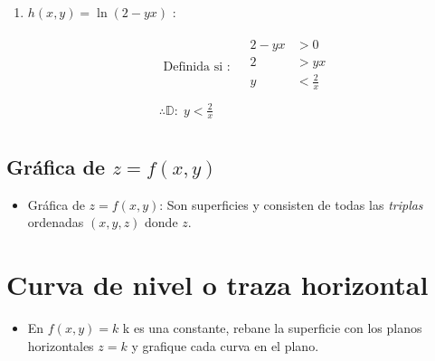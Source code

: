 \begin{enumerate}
    \item $h(x,y)=\ln(2-yx)$ : 
        \begin{center}
           \begin{align*}
               \text{  Definida si  }: \quad \begin{matrix}
                   2-yx &> 0 \\ 
                   2 &> yx \\ 
                   y &< \frac{2}{x} \\ 
               \end{matrix} \\ 
               \therefore \mathbb{D}: \; y < \frac{2}{x} \\ 
           \end{align*}
        \end{center}
\end{enumerate}


\subsection{Gráfica de $z=f(x,y)$}
\begin{itemize}
    \item Gráfica de $z=f(x,y)$: Son superficies y consisten de todas las \emph{triplas} ordenadas $(x,y,z)$ donde $z$.
\end{itemize}



\section{Curva de nivel o traza horizontal}
\begin{itemize}
    \item En $f(x,y)=k$ k es una constante, rebane la superficie con los planos horizontales $z=k$ y grafique cada curva en el plano.
\end{itemize}



















    

